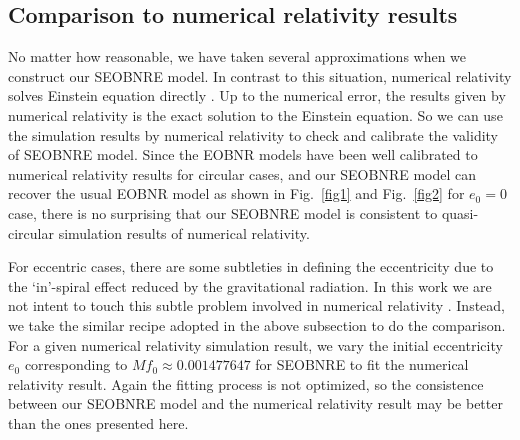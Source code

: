 \documentclass[prd,aps,a4paper,superscriptaddress,twocolumn,footinbib,showpacs]{revtex4}
\begin{document}
\subsection{Comparison to numerical relativity results}
No matter how reasonable, we have taken several approximations when we construct our SEOBNRE model. In contrast to this situation, numerical relativity solves Einstein equation directly \cite{baumgarte2010numerical}. Up to the numerical error, the results given by numerical relativity is the exact solution to the Einstein equation. So we can use the simulation results by numerical relativity to check and calibrate the validity of SEOBNRE model. Since the EOBNR models have been well calibrated to numerical relativity results for circular cases, and our SEOBNRE model can recover the usual EOBNR model as shown in Fig.~\ref{fig1} and Fig.~\ref{fig2} for $e_0=0$ case, there is no surprising that our SEOBNRE model is consistent to quasi-circular simulation results of numerical relativity.

For eccentric cases, there are some subtleties in defining the eccentricity due to the `in'-spiral effect reduced by the gravitational radiation. In this work we are not intent to touch this subtle problem involved in numerical relativity \cite{pfeiffer2007reducing,PhysRevD.82.124016}. Instead, we take the similar recipe adopted in the above subsection to do the comparison. For a given numerical relativity simulation result, we vary the initial eccentricity $e_0$ corresponding to $Mf_0\approx0.001477647$ for SEOBNRE to fit the numerical relativity result. Again the fitting process is not optimized, so the consistence between our SEOBNRE model and the numerical relativity result may be better than the ones presented here.
\end{document}
